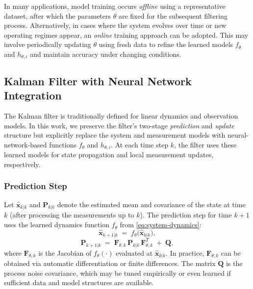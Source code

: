 \documentclass[letterpaper, 10 pt, conference]{ieeeconf}
\begin{document}
In many applications, model training occurs \emph{offline} using a representative dataset, after which the parameters $\theta$ are fixed for the subsequent filtering process. Alternatively, in cases where the system evolves over time or new operating regimes appear, an \emph{online} training approach can be adopted. This may involve periodically updating $\theta$ using fresh data to refine the learned models $f_{\theta}$ and $h_{\theta,i}$ and maintain accuracy under changing conditions.

\subsection{Kalman Filter with Neural Network Integration}
\label{sec:kf-steps}

The Kalman filter is traditionally defined for linear dynamics and observation models. In this work, we preserve the filter’s two-stage \emph{prediction} and \emph{update} structure but explicitly replace the system and measurement models with neural-network-based functions $f_{\theta}$ and $h_{\theta,i}$. At each time step $k$, the filter uses these learned models for state propagation and local measurement updates, respectively.

\subsubsection{Prediction Step}
Let $\hat{\mathbf{x}}_{k|k}$ and $\mathbf{P}_{k|k}$ denote the estimated mean and covariance of the state at time $k$ (after processing the measurements up to $k$). The prediction step for time $k{+}1$ uses the learned dynamics function $f_{\theta}$ from \eqref{eq:system-dynamics}:
\begin{equation}
    \hat{\mathbf{x}}_{k+1|k} \;=\; f_{\theta}\bigl(\hat{\mathbf{x}}_{k|k}\bigr),
    \label{eq:kf-prediction-state}
\end{equation}
\begin{equation}
    \mathbf{P}_{k+1|k} \;=\; \mathbf{F}_{\theta,k}\,\mathbf{P}_{k|k}\,\mathbf{F}_{\theta,k}^{T} \;+\; \mathbf{Q},
    \label{eq:kf-prediction-cov}
\end{equation}
where $\mathbf{F}_{\theta,k}$ is the Jacobian of $f_{\theta}(\cdot)$ evaluated at $\hat{\mathbf{x}}_{k|k}$. In practice, $\mathbf{F}_{\theta,k}$ can be obtained via automatic differentiation or finite differences. The matrix $\mathbf{Q}$ is the process noise covariance, which may be tuned empirically or even learned if sufficient data and model structures are available.
\end{document}
